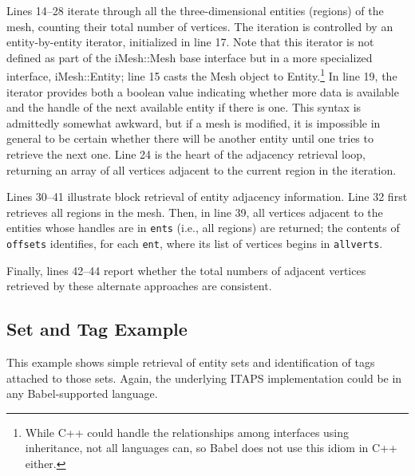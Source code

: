 Lines 14--28 iterate through all the three-dimensional entities
(regions) of the mesh, counting their total number of vertices.  The
iteration is controlled by an entity-by-entity iterator, initialized in
line 17.  Note that this iterator is not defined as part of the
iMesh::Mesh base interface but in a more specialized interface,
iMesh::Entity; line 15 casts the Mesh object to Entity.\footnote{While
C++ could handle the relationships among interfaces using inheritance,
not all languages can, so Babel does not use this idiom in C++ either.}
In line 19, the iterator provides both a boolean value indicating
whether more data is available and the handle of the next available
entity if there is one.  This syntax is admittedly somewhat awkward, but
if a mesh is modified, it is impossible in general to be certain whether
there will be another entity until one tries to retrieve the next one.
Line 24 is the heart of the adjacency retrieval loop, returning an array
of all vertices adjacent to the current region in the iteration.

Lines 30--41 illustrate block retrieval of entity adjacency information.
Line 32 first retrieves all regions in the mesh.  Then, in line 39, all
vertices adjacent to the entities whose handles are in {\tt ents} (i.e.,
all regions) are returned; the contents of {\tt offsets} identifies, for
each {\tt ent}, where its list of vertices begins in {\tt allverts}.

Finally, lines 42--44 report whether the total numbers of adjacent
vertices retrieved by these alternate approaches are consistent.

\subsection{Set and Tag Example}

This example shows simple retrieval of entity sets and identification of
tags attached to those sets.  Again, the underlying ITAPS
implementation could be in any Babel-supported language.  

